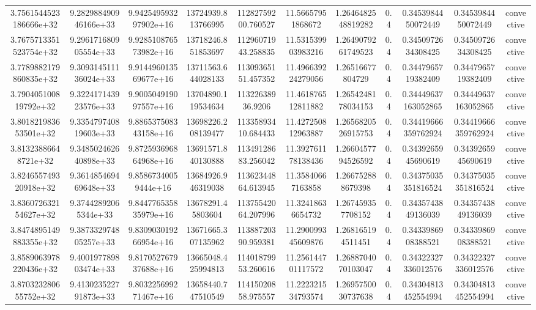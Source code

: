 \begin{table}
\begin{tabular}{ccccccccccc}
3.7561544523186666e+32 & 9.282988490946166e+33 & 9.942549593297902e+16 & 13724939.813766995 & 11282759200.760527 & 11.56657951868672 & 1.2646482548819282 & 0.4 & 0.3453984450072449 & 0.3453984450072449 & convective \\
3.7675713351523754e+32 & 9.296171680905554e+33 & 9.928510876573982e+16 & 13718246.851853697 & 11296071943.258835 & 11.531539903983216 & 1.2649079261749523 & 0.4 & 0.3450972634308425 & 0.3450972634308425 & convective \\
3.7789882179860835e+32 & 9.309314511136024e+33 & 9.914496013569677e+16 & 13711563.644028133 & 11309365151.457352 & 11.496639224279056 & 1.26516677804729 & 0.4 & 0.3447965719382409 & 0.3447965719382409 & convective \\
3.790405100819792e+32 & 9.322417143923576e+33 & 9.900504919097557e+16 & 13704890.119534634 & 11322638936.9206 & 11.461876512811882 & 1.2654248178034153 & 0.4 & 0.34449637163052865 & 0.34449637163052865 & convective \\
3.801821983653501e+32 & 9.335479740819603e+33 & 9.886537508343158e+16 & 13698226.208139477 & 11335893410.684433 & 11.427250812963887 & 1.2656820526915753 & 0.4 & 0.34419666359762924 & 0.34419666359762924 & convective \\
3.81323886648721e+32 & 9.348502462640898e+33 & 9.872593696864968e+16 & 13691571.840130888 & 11349128683.256042 & 11.392761178138436 & 1.2660457794526592 & 0.4 & 0.3439265945690619 & 0.3439265945690619 & convective \\
3.824655749320918e+32 & 9.361485469469648e+33 & 9.85867340059444e+16 & 13684926.946319038 & 11362344864.613945 & 11.35840667163858 & 1.266752888679398 & 0.4 & 0.34375035351816524 & 0.34375035351816524 & convective \\
3.836072632154627e+32 & 9.37442892065344e+33 & 9.844776535835979e+16 & 13678291.45803604 & 11375542064.207996 & 11.32418636654732 & 1.267459357708152 & 0.4 & 0.3435743849136039 & 0.3435743849136039 & convective \\
3.8474895149883355e+32 & 9.387332974805257e+33 & 9.830903019266954e+16 & 13671665.307135962 & 11388720390.959381 & 11.290099345609876 & 1.268165194511451 & 0.4 & 0.3433986908388521 & 0.3433986908388521 & convective \\
3.8589063978220436e+32 & 9.400197789803474e+33 & 9.817052767937688e+16 & 13665048.425994813 & 11401879953.260616 & 11.256144701117572 & 1.2688704070103047 & 0.4 & 0.34322327336012576 & 0.34322327336012576 & convective \\
3.870323280655752e+32 & 9.413023522791873e+33 & 9.803225699271467e+16 & 13658440.747510549 & 11415020858.975557 & 11.222321534793574 & 1.2695750030737638 & 0.4 & 0.34304813452554994 & 0.34304813452554994 & convective \\

\end{tabular}
\end{table}
